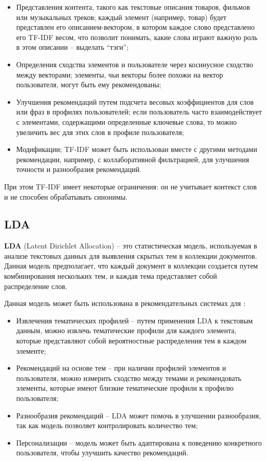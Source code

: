 \begin{itemize}
	\item Представления контента, такого как текстовые описания товаров, фильмов или музыкальных треков; каждый элемент (например, товар) будет представлен его описанием-вектором, в котором каждое слово представлено его TF-IDF весом, что позволит понимать, какие слова играют важную роль в этом описании -- выделать ``тэги'';
	\item Определения сходства элементов и пользователе через косинусное сходство между векторами; элементы, чьи векторы более похожи на вектор пользователя, могут быть ему рекомендованы;
	\item Улучшения рекомендаций путем подсчета весовых коэффициентов для слов или фраз в профилях пользователей; если пользователь часто взаимодействует с элементами, содержащими определенные ключевые слова, то можно увеличить вес для этих слов в профиле пользователя;
	\item Модификации; TF-IDF может быть использован вместе с другими методами рекомендации, например, с коллаборативной фильтрацией, для улучшения точности и разнообразия рекомендаций.
\end{itemize}

При этом TF-IDF имеет некоторые ограничения: он не учитывает контекст слов и не способен обрабатывать синонимы. \cite{tfidf}

\subsection{LDA}

\textbf{LDA} (Latent Dirichlet Allocation) -- это статистическая модель, используемая в анализе текстовых данных для выявления скрытых тем в коллекции документов. Данная модель предполагает, что каждый документ в коллекции создается путем комбинирования нескольких тем, и каждая тема представляет собой распределение слов. \cite{lda}

Данная модель может быть использована в рекомендательных системах для \cite{lda}:

\begin{itemize}
	\item Извлечения тематических профилей -- путем применения LDA к текстовым данным, можно извлечь тематические профили для каждого элемента, которые представляют собой вероятностные распределения тем в каждом элементе;
	\item Рекомендаций на основе тем -- при наличии профилей элементов и пользователя, можно измерить сходство между темами и рекомендовать элементы, которые имеют близкие тематические профили к профилю пользователя;
	\item Разнообразия рекомендаций -- LDA может помочь в улучшении разнообразия, так как модель позволяет контролировать количество тем;
	\item Персонализации -- модель может быть адаптирована к поведению конкретного пользователя, чтобы улучшить качество рекомендаций.
\end{itemize}

